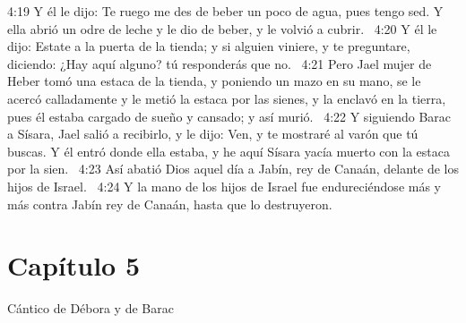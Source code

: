 4:19 Y él le dijo: Te ruego me des de beber un poco de agua, pues tengo sed. Y ella abrió un odre de leche y le dio de beber, y le volvió a cubrir.  
4:20 Y él le dijo: Estate a la puerta de la tienda; y si alguien viniere, y te preguntare, diciendo: ¿Hay aquí alguno? tú responderás que no.  
4:21 Pero Jael mujer de Heber tomó una estaca de la tienda, y poniendo un mazo en su mano, se le acercó calladamente y le metió la estaca por las sienes, y la enclavó en la tierra, pues él estaba cargado de sueño y cansado; y así murió.  
4:22 Y siguiendo Barac a Sísara, Jael salió a recibirlo, y le dijo: Ven, y te mostraré al varón que tú buscas. Y él entró donde ella estaba, y he aquí Sísara yacía muerto con la estaca por la sien.  
4:23 Así abatió Dios aquel día a Jabín, rey de Canaán, delante de los hijos de Israel.  
4:24 Y la mano de los hijos de Israel fue endureciéndose más y más contra Jabín rey de Canaán, hasta que lo destruyeron.  
\section*{Capítulo 5}
Cántico de Débora y de Barac  

